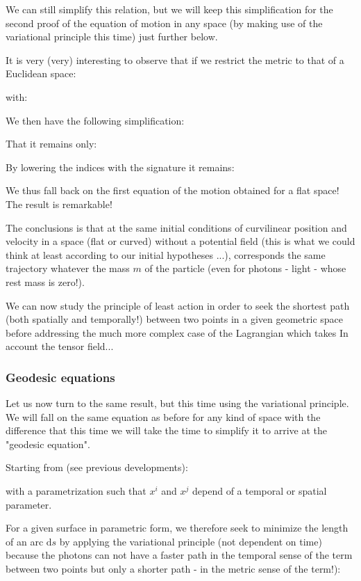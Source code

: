 	We can still simplify this relation, but we will keep this simplification for the second proof of the equation of motion in any space (by making use of the variational principle this time) just further below.

	It is very (very) interesting to observe that if we restrict the metric to that of a Euclidean space:
	
	with:
	
	We then have the following simplification:
	
	That it remains only:
	
	By lowering the indices with the signature it remains:
	
	We thus fall back on the first equation of the motion obtained for a flat space! The result is remarkable!

	The conclusions is that at the same initial conditions of curvilinear position and velocity in a space (flat or curved) without a potential field (this is what we could think at least according to our initial hypotheses ...), corresponds the same trajectory whatever the mass $m$ of the particle (even for photons - light - whose rest mass is zero!).

	We can now study the principle of least action in order to seek the shortest path (both spatially and temporally!) between two points in a given geometric space before addressing the much more complex case of the Lagrangian which takes In account the tensor field...
	
	\subsubsection{Geodesic equations}
	Let us now turn to the same result, but this time using the variational principle. We will fall on the same equation as before for any kind of space with the difference that this time we will take the time to simplify it to arrive at the "geodesic equation".

	Starting from (see previous developments):
	
	with a parametrization such that $x^i$ and $x^j$ depend of a temporal or spatial parameter.

	For a given surface in parametric form, we therefore seek to minimize the length of an arc $\mathrm{d}s$ by applying the variational principle (not dependent on time) because the photons can not have a faster path in the temporal sense of the term between two points but only a shorter path - in the metric sense of the term!):
	

